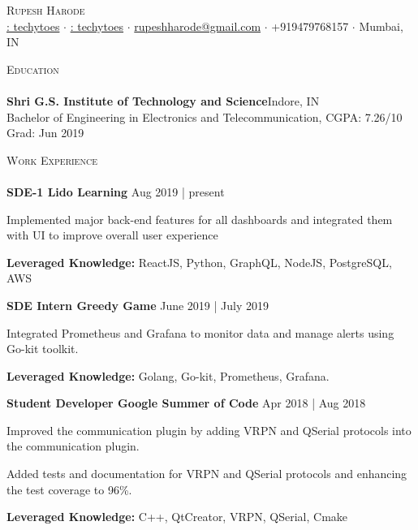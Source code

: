 \documentclass[a4paper]{article}
\newcommand{\lineunder} {
    \vspace*{-8pt} \\
    \hspace*{-18pt} \hrulefill \\
}
\newcommand{\header} [1] {
    {\hspace*{-18pt}\vspace*{6pt} \textsc{#1}}
    \vspace*{-6pt} \lineunder
}
\begin{document}
\vspace*{-40pt}

\vspace*{-10pt}
\begin{center}
	{\Huge \scshape {Rupesh Harode}}\\
	{\faLinkedin \href{https://www.linkedin.com/in/techytoes/}{: techytoes}}
	$\cdot$
	{\faGithub \href{https://github.com/techytoes}{ : techytoes}}
	$\cdot$
	\href{mailto:rupeshharode@gmail.com}{rupeshharode@gmail.com} $\cdot$ +919479768157 $\cdot$ Mumbai, IN \\
\end{center}
\vspace*{1mm}
\header{Education}
\textbf{Shri G.S. Institute of Technology and Science}\hfill Indore, IN\\
Bachelor of Engineering in Electronics and Telecommunication, CGPA: 7.26/10 \hfill Grad: Jun 2019\\
\vspace*{1mm}
\header{Work Experience}
\textbf{SDE-1  \hfill Lido Learning} \hfill Aug 2019 | present\\
\vspace{-1mm}
\begin{itemize} \itemsep 1pt
	\small{\item Implemented major back-end features for all dashboards and integrated them with UI to improve overall user experience}
	\small{\item \textbf{Leveraged Knowledge:} ReactJS, Python, GraphQL, NodeJS, PostgreSQL, AWS}
\end{itemize}

\textbf{SDE Intern  \hfill Greedy Game} \hfill June 2019 | July 2019\\
\vspace{-1mm}
\begin{itemize} \itemsep 1pt
	\small{\item Integrated Prometheus and Grafana to monitor data and manage alerts using Go-kit toolkit.}
	\small{\item \textbf{Leveraged Knowledge:} Golang, Go-kit, Prometheus, Grafana.}
\end{itemize}


\textbf{Student Developer  \hfill Google Summer of Code} \hfill Apr 2018 | Aug 2018\\
\vspace{-1mm}
\begin{itemize} \itemsep 1pt
	\small{\item Improved the communication plugin by adding VRPN and QSerial protocols into the communication plugin.}
	\small{\item  Added tests and documentation for VRPN and QSerial protocols and enhancing the test coverage to 96\%.}
	\small{\item \textbf{Leveraged Knowledge:} C++, QtCreator, VRPN, QSerial, Cmake}
\end{itemize}
\end{document}
